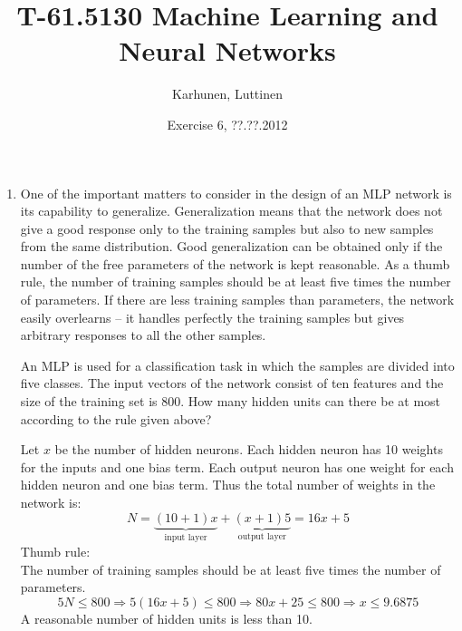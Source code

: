 \title{T-61.5130 Machine Learning and Neural Networks}
\author{Karhunen, Luttinen}
\date{Exercise 6, ??.??.2012}

\newcommand{\vect}[1]{{\bf{#1}}}
\newcommand{\svect}[1]{\boldsymbol{#1}}
\newcommand{\matr}[1]{\boldsymbol{#1}}
\newcommand{\T}{\mathcal{T}}
\newcommand{\x}{{\bf x}}





\begin{enumerate}

\item One of the important matters to consider in the design of an MLP
  network is its capability to generalize. Generalization means that
  the network does not give a good response only to the training
  samples but also to new samples from the same distribution. Good
  generalization can be obtained only if the number of the free
  parameters of the network is kept reasonable. As a thumb rule, the
  number of training samples should be at least five times the number
  of parameters. If there are less training samples than parameters,
  the network easily overlearns -- it handles perfectly the training
  samples but gives arbitrary responses to all the other samples.

  An MLP is used for a classification task in which the samples are
  divided into five classes. The input vectors of the network consist
  of ten features and the size of the training set is 800. How many
  hidden units can there be at most according to the rule given above?

  \begin{solution}

    Let $x$ be the number of hidden neurons. Each hidden neuron has
    10 weights for the inputs and one bias term. Each output neuron has one
    weight for each hidden neuron and one bias term. Thus the total number
    of weights in the network is:
    \begin{equation*}
      N=\underbrace{(10+1)x}_{\text{input
          layer}}+\underbrace{(x+1)5}_{\text{output layer}}=16x+5
    \end{equation*}
    Thumb rule:\\
    The number of  training samples should be at least five times the
    number of parameters.
    \begin{equation*}
      5N\leq800 \Rightarrow 5(16x+5)\leq 800\Rightarrow 80x+25\leq
      800\Rightarrow x\leq9.6875
    \end{equation*}
    A reasonable number of hidden units is less than 10.
  \end{solution}
  


\end{enumerate}
